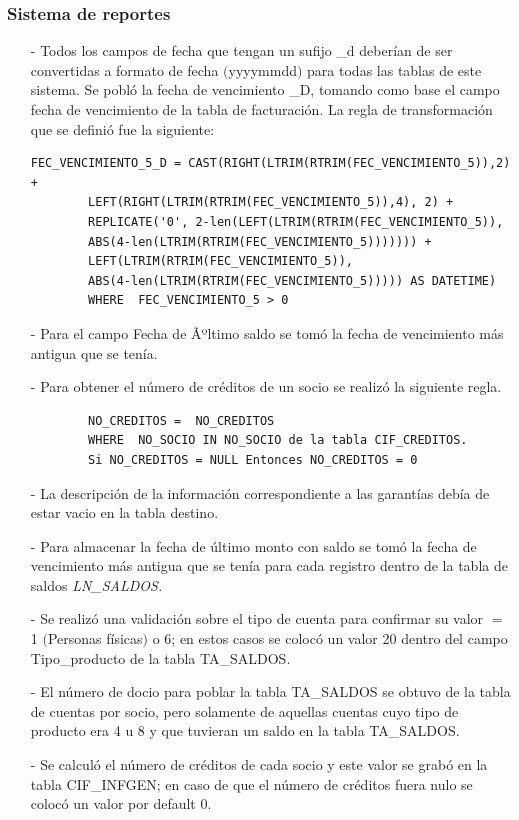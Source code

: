 \documentclass[a4paper,openright,12pt]{book}
\begin{document}
\subsubsection{Sistema de reportes}
\begin{itemize}
\item[-] Todos los campos de fecha que tengan un sufijo \_d deberían de ser convertidas a formato de fecha $($yyyymmdd$)$ para todas las tablas de este sistema. Se pobló la fecha de vencimiento \_D, tomando como base el campo fecha de vencimiento de la tabla de facturación. La regla de transformación que se definió fue la siguiente:
\begin{verbatim}
FEC_VENCIMIENTO_5_D = CAST(RIGHT(LTRIM(RTRIM(FEC_VENCIMIENTO_5)),2) +
        LEFT(RIGHT(LTRIM(RTRIM(FEC_VENCIMIENTO_5)),4), 2) +  
        REPLICATE('0', 2-len(LEFT(LTRIM(RTRIM(FEC_VENCIMIENTO_5)), 
        ABS(4-len(LTRIM(RTRIM(FEC_VENCIMIENTO_5))))))) +
        LEFT(LTRIM(RTRIM(FEC_VENCIMIENTO_5)), 
        ABS(4-len(LTRIM(RTRIM(FEC_VENCIMIENTO_5))))) AS DATETIME)     
        WHERE  FEC_VENCIMIENTO_5 > 0
\end{verbatim}
\item[-] Para el campo Fecha de Ãºltimo saldo se tomó la fecha de vencimiento más antigua que se tenía.
\item[-] Para obtener el número de créditos de un socio se realizó la siguiente regla.
\begin{verbatim}
        NO_CREDITOS =  NO_CREDITOS 
        WHERE  NO_SOCIO IN NO_SOCIO de la tabla CIF_CREDITOS.
        Si NO_CREDITOS = NULL Entonces NO_CREDITOS = 0
\end{verbatim} 
\item[-] La descripción de la información correspondiente a las garantías debía de estar vacio en la tabla destino.
\item[-] Para almacenar la fecha de último monto con saldo se tomó la fecha de vencimiento más antigua que se tenía para cada registro dentro de la tabla de saldos \textit{LN\_SALDOS.}
\item[-] Se realizó una validación sobre el tipo de cuenta para confirmar su valor $=$ 1 $($Personas físicas$)$ o 6; en estos casos se colocó un valor 20 dentro del campo Tipo\_producto de la tabla TA\_SALDOS.
\item[-] El número de docio para poblar la tabla TA\_SALDOS se obtuvo de la tabla de cuentas por socio, pero solamente de aquellas cuentas cuyo tipo de producto era 4 u 8 y que tuvieran un saldo en la tabla TA\_SALDOS.
\item[-] Se calculó el número de créditos de cada socio y este valor se grabó en la tabla CIF\_INFGEN; en caso de que el número de créditos fuera nulo se colocó un valor por default 0.

\end{itemize}
\end{document}
